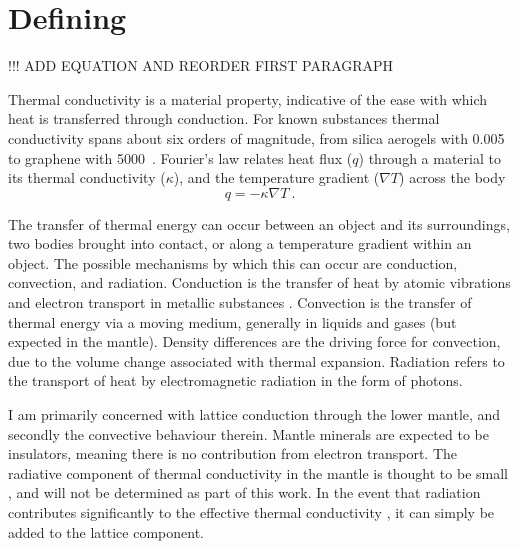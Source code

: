 \section{Defining \tc}
\label{sec:defining_tc}

!!! ADD EQUATION AND REORDER FIRST PARAGRAPH

Thermal conductivity is a material property, indicative of the ease with which heat is transferred through conduction. For known substances thermal conductivity spans about six orders of magnitude, from silica aerogels with 0.005~\wmks \citep{Lee1995} to graphene with 5000~\wmks \citep{Balandin2008}. Fourier's law relates heat flux ($q$) through a material to its thermal conductivity ($\kappa$), and the temperature gradient ($\nabla{T}$) across the body
%
\begin{equation}
q=-\kappa \nabla{T}\ . 
\label{eq:fourier1}
\end{equation}

The transfer of thermal energy can occur between an object and its surroundings, two bodies brought into contact, or along a temperature gradient within an object. The possible mechanisms by which this can occur are conduction, convection, and radiation. Conduction is the transfer of heat by atomic vibrations and electron transport in metallic substances \citep[such as in the outer core, e.g.][C.D. REFERENCE, SUITABLE???]{Pozzo2012}. Convection is the transfer of thermal energy via a moving medium, generally in liquids and gases (but expected in the mantle). Density differences are the driving force for convection, due to the volume change associated with thermal expansion. Radiation refers to the transport of heat by electromagnetic radiation in the form of photons.

I am primarily concerned with lattice conduction through the lower mantle, and secondly the convective behaviour therein. Mantle minerals are expected to be insulators, meaning there is no contribution from electron transport. The radiative component of thermal conductivity in the mantle is thought to be small \citep{Goncharov2008}, and will not be determined as part of this work. In the event that radiation contributes significantly to the effective thermal conductivity \citep{Keppler2008}, it can simply be added to the lattice component.

